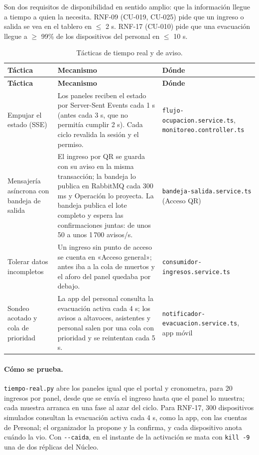 Son dos requisitos de disponibilidad en sentido amplio: que la información llegue a tiempo a quien
la necesita. RNF-09 (CU-019, CU-025) pide que un ingreso o salida se vea en el tablero en
$\leq$ 2 s. RNF-17 (CU-010) pide que una evacuación llegue a $\geq$ 99\% de los dispositivos del
personal en $\leq$ 10 s.

\begin{center}
\begin{longtable}{|>{\raggedright\arraybackslash}p{2.8cm}|>{\raggedright\arraybackslash}p{6.7cm}|>{\raggedright\arraybackslash}p{3.8cm}|}
\caption{Tácticas de tiempo real y de aviso.}\label{tab:tiempo-real-vigente}\\
\hline
\textbf{Táctica} & \textbf{Mecanismo} & \textbf{Dónde}\\
\hline
\endfirsthead
\hline
\textbf{Táctica} & \textbf{Mecanismo} & \textbf{Dónde}\\
\hline
\endhead
Empujar el estado (SSE) &
Los paneles reciben el estado por Server-Sent Events cada 1 s (antes cada 3 s, que no permitía
cumplir 2 s). Cada ciclo revalida la sesión y el permiso. &
\texttt{flujo-ocupacion.\allowbreak service.ts}, \texttt{monitoreo.\allowbreak controller.ts}\\
\hline
Mensajería asíncrona con bandeja de salida &
El ingreso por QR se guarda con su aviso en la misma transacción; la bandeja lo publica en
RabbitMQ cada 300 ms y Operación lo proyecta. La bandeja publica el lote completo y espera las
confirmaciones juntas: de unos 50 a unos 1\,700 avisos/s. &
\texttt{bandeja-salida.\allowbreak service.ts} (Acceso QR)\\
\hline
Tolerar datos incompletos &
Un ingreso sin punto de acceso se cuenta en «Acceso general»; antes iba a la cola de muertos y el
aforo del panel quedaba por debajo. &
\texttt{consumidor-\allowbreak ingresos.\allowbreak service.ts}\\
\hline
Sondeo acotado y cola de prioridad &
La app del personal consulta la evacuación activa cada 4 s; los avisos a altavoces, asistentes y
personal salen por una cola con prioridad y se reintentan cada 5 s. &
\texttt{notificador-\allowbreak evacuacion.\allowbreak service.ts}, app móvil\\
\hline
\end{longtable}
\end{center}

\paragraph{Cómo se prueba.} \texttt{tiempo-real.py} abre los paneles igual que el portal y
cronometra, para 20 ingresos por panel, desde que se envía el ingreso hasta que el panel lo
muestra; cada muestra arranca en una fase al azar del ciclo. Para RNF-17, 300 dispositivos
simulados consultan la evacuación activa cada 4 s, como la app, con las cuentas de Personal; el
organizador la propone y la confirma, y cada dispositivo anota cuándo la vio. Con
\texttt{-{}-caida}, en el instante de la activación se mata con \texttt{kill -9} una de dos réplicas
del Núcleo.

